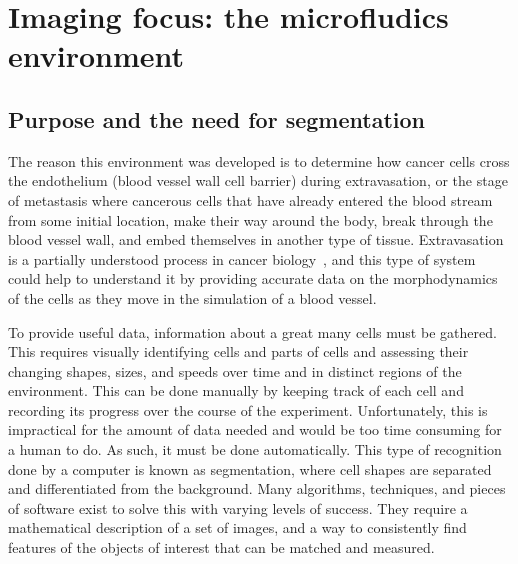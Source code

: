 
\chapter{Imaging focus: the microfludics environment}

\ifpdf
    \graphicspath{{Chapter2/Figs/Raster/}{Chapter2/Figs/PDF/}{Chapter2/Figs/}}
\else
    \graphicspath{{Chapter2/Figs/Vector/}{Chapter2/Figs/}}
\fi

\section{Purpose and the need for segmentation}

The reason this environment was developed is to determine how cancer cells cross the endothelium (blood vessel wall cell barrier) during extravasation, or the stage of metastasis where cancerous cells that have already entered the blood stream from some initial location, make their way around the body, break through the blood vessel wall, and embed themselves in another type of tissue. Extravasation is a partially understood process in cancer biology~\cite{Reymond:13}, and this type of system could help to understand it by providing accurate data on the morphodynamics of the cells as they move in the simulation of a blood vessel.

To provide useful data, information about a great many cells must be gathered. This requires visually identifying cells and parts of cells and assessing their changing shapes, sizes, and speeds over time and in distinct regions of the environment. This can be done manually by keeping track of each cell and recording its progress over the course of the experiment. Unfortunately, this is impractical for the amount of data needed and would be too time consuming for a human to do. As such, it must be done automatically. This type of recognition done by a computer is known as segmentation, where cell shapes are separated and differentiated from the background. Many algorithms, techniques, and pieces of software exist to solve this with varying levels of success. They require a mathematical description of a set of images, and a way to consistently find features of the objects of interest that can be matched and measured.


